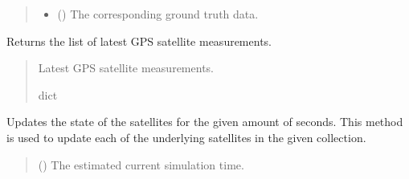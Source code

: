\documentclass[letterpaper,10pt,english]{sphinxmanual}
\begin{document}
\begin{fulllineitems}
\begin{fulllineitems}
\begin{quote}
\begin{description}
\begin{itemize}
\item {} 
\sphinxAtStartPar
{} ({\hyperref[\detokenize{modules/waypoints/trajectory:qnav.waypoints.trajectory.GroundTruth}]{}}) \textendash{} The corresponding ground truth data.

\end{itemize}

\end{description}\end{quote}

\end{fulllineitems}


\begin{fulllineitems}
\label{\detokenize{modules/gps/sensor:qnav.gps.sensor.GpsSensor.last_measurement}}
\pysigstartsignatures
{}
\pysigstopsignatures
\sphinxAtStartPar
Returns the list of latest GPS satellite measurements.
\begin{quote}\begin{description}
\sphinxAtStartPar
Latest GPS satellite measurements.

\sphinxAtStartPar
dict

\end{description}\end{quote}

\end{fulllineitems}


\begin{fulllineitems}
\label{\detokenize{modules/gps/sensor:qnav.gps.sensor.GpsSensor.update}}
\pysigstartsignatures
{}
\pysigstopsignatures
\sphinxAtStartPar
Updates the state of the satellites for the given amount of seconds.
This method is used to update each of the underlying satellites in
the given collection.
\begin{quote}\begin{description}
\sphinxAtStartPar
{} () \textendash{} The estimated current simulation time.


\end{description}
\end{quote}
\end{fulllineitems}
\end{fulllineitems}
\end{document}

